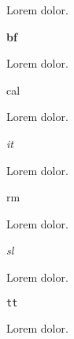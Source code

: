 



{}


Lorem  dolor.

{\bf bf}

Lorem  dolor.

{\cal cal}

Lorem  dolor.

{\it it}

Lorem  dolor.

{\rm rm}

Lorem  dolor.

{\sl sl}

Lorem  dolor.

{\tt tt}

Lorem  dolor.

\bye
